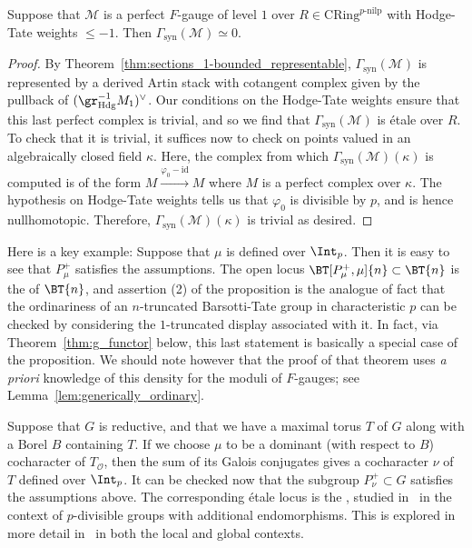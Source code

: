 \documentclass[10pt]{amsart}
\begin{document}
\begin{lemma}
\label{lem:ht_wts_le_-1}
Suppose that $\mathcal{M}$ is a perfect $F$-gauge of level $1$ over $R\in \mathrm{CRing}^{p\text{-nilp}}$ with Hodge-Tate weights $\leq -1$. Then $\Gamma_{\mathrm{syn}}(\mathcal{M})\simeq 0$.
\end{lemma} 
\begin{proof}
By Theorem~\ref{thm:sections_1-bounded_representable}, $\Gamma_{\mathrm{syn}}(\mathcal{M})$ is represented by a derived Artin stack with cotangent complex given by the pullback of $(\gr^{-1}_{\mathrm{Hdg}}M_1)^\vee$. Our conditions on the Hodge-Tate weights ensure that this last perfect complex is trivial, and so we find that $\Gamma_{\mathrm{syn}}(\mathcal{M})$ is \'etale over $R$. To check that it is trivial, it suffices now to check on points valued in an algebraically closed field $\kappa$. Here, the complex from which $\Gamma_{\mathrm{syn}}(\mathcal{M})(\kappa)$ is computed is of the form $M\xrightarrow{\varphi_0- \mathrm{id}}M$ where $M$ is a perfect complex over $\kappa$. The hypothesis on Hodge-Tate weights tells us that $\varphi_0$ is divisible by $p$, and is hence nullhomotopic. Therefore, $\Gamma_{\mathrm{syn}}(\mathcal{M})(\kappa)$ is trivial as desired.
\end{proof} 

\begin{remark}
\label{rem:ordinary_locus}
Here is a key example: Suppose that $\mu$ is defined over $\Int_p$. Then it is easy to see that $P^+_\mu$ satisfies the assumptions. The open locus $\BT[P^+_\mu,\mu]{n}\subset \BT{n}$ is the  of $\BT{n}$, and assertion (2) of the proposition is the analogue of fact that the ordinariness of an $n$-truncated Barsotti-Tate group in characteristic $p$ can be checked by considering the $1$-truncated display associated with it. In fact, via Theorem~\ref{thm:g_functor} below, this last statement is basically a special case of the proposition. We should note however that the proof of that theorem uses \emph{a priori} knowledge of this density for the moduli of $F$-gauges; see Lemma~\ref{lem:generically_ordinary}.
\end{remark}

\begin{remark}
\label{rem:mu_ordinary_locus}
Suppose that $G$ is reductive, and that we have a maximal torus $T$ of $G$ along with a Borel $B$ containing $T$. If we choose $\mu$ to be a dominant (with respect to $B$) cocharacter of $T_{\mathcal{O}}$, then the sum of its Galois conjugates gives a cocharacter $\nu$ of $T$ defined over $\Int_p$. It can be checked now that the subgroup $P^+_\nu\subset G$ satisfies the assumptions above. The corresponding \'etale locus is the , studied in~\cite{Moonen2004-cc} in the context of $p$-divisible groups with additional endomorphisms. This is explored in more detail in~\cite{MadYoucis} in both the local and global contexts.
\end{remark}   
\end{document}
